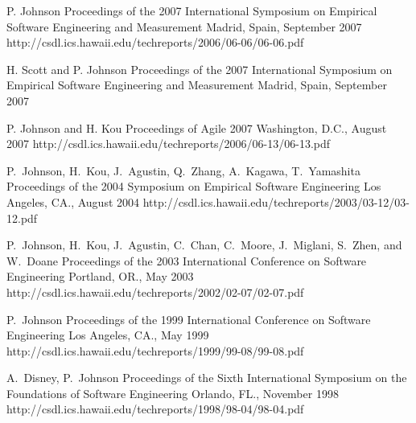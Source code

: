\documentclass[11pt,letterpaper,sans]{moderncv} %
\begin{document}
          {P. Johnson}
          {Proceedings of the 2007 International Symposium on Empirical Software Engineering and Measurement}
          {Madrid, Spain, September 2007}
          {http://csdl.ics.hawaii.edu/techreports/2006/06-06/06-06.pdf}

          {H. Scott and P. Johnson}
          {Proceedings of the 2007 International Symposium on Empirical Software Engineering and Measurement}
          {Madrid, Spain, September 2007}

          {P. Johnson and H. Kou}
          {Proceedings of Agile 2007}
          {Washington, D.C., August 2007}
          {http://csdl.ics.hawaii.edu/techreports/2006/06-13/06-13.pdf}

          {P.~Johnson, H.~Kou, J.~Agustin, Q.~Zhang, A.~Kagawa, T.~Yamashita}
          {Proceedings of the 2004 Symposium on Empirical Software Engineering}
          {Los Angeles, CA., August 2004}
          {http://csdl.ics.hawaii.edu/techreports/2003/03-12/03-12.pdf}

          {P.~Johnson, H.~Kou, J.~Agustin, C.~Chan, C.~Moore, J.~Miglani, S.~Zhen, and W.~Doane}
          {Proceedings of the 2003 International Conference on Software Engineering}
          {Portland, OR., May 2003}
          {http://csdl.ics.hawaii.edu/techreports/2002/02-07/02-07.pdf}

          {P.~Johnson}
          {Proceedings of the 1999 International Conference on Software Engineering}
          {Los Angeles, CA., May 1999}
          {http://csdl.ics.hawaii.edu/techreports/1999/99-08/99-08.pdf}

          {A.~Disney, P.~Johnson}
          {Proceedings of the Sixth International Symposium on the Foundations of Software Engineering}
          {Orlando, FL., November 1998}
          {http://csdl.ics.hawaii.edu/techreports/1998/98-04/98-04.pdf}
\end{document}

